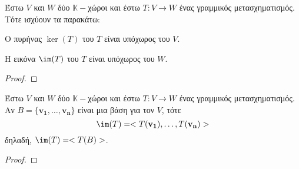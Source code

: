 \begin{thm}
  Έστω $V$ και $W$  δύο  $ \mathbb{K}- $χώροι  και έστω  $ T \colon V \to W $  ένας 
  γραμμικός μετασχηματισμός. Τότε ισχύουν τα παρακάτω:
  \begin{myitemize}
    \item Ο πυρήνας $ \ker(T)  $ του $T$ είναι υπόχωρος του $V$. 
    \item Η εικόνα $ \im(T)  $ του $T$ είναι υπόχωρος του $W$.
  \end{myitemize}
\end{thm}

\begin{proof}

\end{proof}

\begin{thm}
  Έστω $V$ και $W$ δύο $ \mathbb{K}- $χώροι και έστω $ T \colon V \to W $ ένας 
  γραμμικός μετασχηματισμός. Αν $ B = \{ \mathbf{v_{1}}, \ldots, \mathbf{v_{n}} \} $ 
  είναι μια βάση για τον $V$, τότε
  \[
    \im(T) = < T(\mathbf{v_{1}}), \ldots, T(\mathbf{v_{n}}) >  
  \]
  δηλαδή, $ \im(T) = < T(B) > $.
\end{thm}

\begin{proof}

\end{proof}

